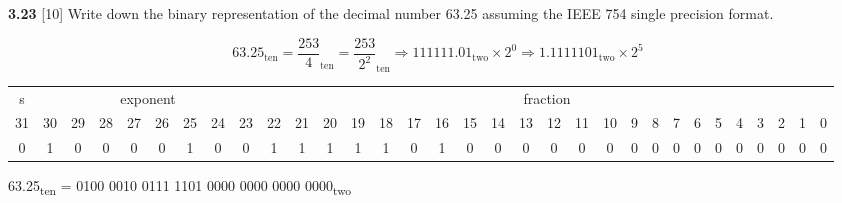 \documentclass[fleqn]{article}
\begin{document}
\vspace{0.5in}
\textbf{3.23} [10] \textrangle \; Write down the binary representation of the decimal number 63.25 assuming the IEEE 754 single precision format.
\begin{addmargin}[0.15cm]{0cm}
\[63.25_{\text{ten}} = \frac{253}{4}_{\text{ten}} = \frac{253}{2^2}_{\text{ten}} \Rightarrow 1111 11.01_{\text{two}} \times 2^0 \Rightarrow 1.111 1101_{\text{two}} \times 2^5 \]
\begin{table}[H]
    \setlength{\tabcolsep}{4pt}
    \fontsize{7pt}{8pt}\selectfont
    \begin{tabular}{c|cccccccc|ccccccccccccccccccccccc}
        s & \multicolumn{8}{c|}{exponent} & \multicolumn{23}{c}{fraction} \\
        31 & 30 & 29 & 28 & 27 & 26 & 25 & 24 & 23 & 22 & 21 & 20 & 19 & 18 & 17 & 16 & 15 & 14 & 13 & 12 & 11 & 10 & 9 & 8 & 7 & 6 & 5 & 4 & 3 & 2 & 1 & 0 \\
        0 & 1 & 0 & 0 & 0 & 0 & 1 & 0 & 0 & 1 & 1 & 1 & 1 & 1 & 0 & 1 & 0 & 0 & 0 & 0 & 0 & 0 & 0 & 0 & 0 & 0 & 0 & 0 & 0 & 0 & 0 & 0
    \end{tabular}
\end{table}
63.25\textsubscript{ten} = 0100 0010 0111 1101 0000 0000 0000 0000\textsubscript{two}
\end{addmargin}
\end{document}
